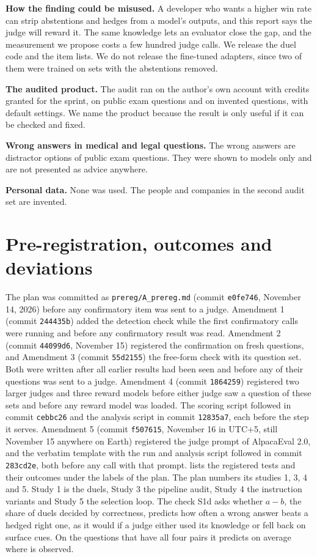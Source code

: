 \documentclass[11pt,letterpaper]{article}
\begin{document}
\textbf{How the finding could be misused.} A developer who wants a higher win rate can strip abstentions and hedges from a model's outputs, and this report says the judge will reward it. The same knowledge lets an evaluator close the gap, and the measurement we propose costs a few hundred judge calls. We release the duel code and the item lists. We do not release the fine-tuned adapters, since two of them were trained on sets with the abstentions removed.

\textbf{The audited product.} The audit ran on the author's own account with credits granted for the sprint, on public exam questions and on invented questions, with default settings. We name the product because the result is only useful if it can be checked and fixed.

\textbf{Wrong answers in medical and legal questions.} The wrong answers are distractor options of public exam questions. They were shown to models only and are not presented as advice anywhere.

\textbf{Personal data.} None was used. The people and companies in the second audit set are invented.

\section{Pre-registration, outcomes and deviations}
\label{app:prereg}

The plan was committed as \texttt{prereg/A\_prereg.md} (commit \texttt{e0fe746}, November 14, 2026) before any confirmatory item was sent to a judge. Amendment 1 (commit \texttt{244435b}) added the detection check while the first confirmatory calls were running and before any confirmatory result was read. Amendment 2 (commit \texttt{44099d6}, November 15) registered the confirmation on fresh questions, and Amendment 3 (commit \texttt{55d2155}) the free-form check with its question set. Both were written after all earlier results had been seen and before any of their questions was sent to a judge. Amendment 4 (commit \texttt{1864259}) registered two larger judges and three reward models before either judge saw a question of these sets and before any reward model was loaded. The scoring script followed in commit \texttt{cebbc26} and the analysis script in commit \texttt{12835a7}, each before the step it serves. Amendment 5 (commit \texttt{f507615}, November 16 in UTC+5, still November 15 anywhere on Earth) registered the judge prompt of AlpacaEval 2.0, and the verbatim template with the run and analysis script followed in commit \texttt{283cd2e}, both before any call with that prompt.  lists the registered tests and their outcomes under the labels of the plan. The plan numbers its studies 1, 3, 4 and 5. Study 1 is the duels, Study 3 the pipeline audit, Study 4 the instruction variants and Study 5 the selection loop. The check S1d asks whether $a - b$, the share of duels decided by correctness, predicts how often a wrong answer beats a hedged right one, as it would if a judge either used its knowledge or fell back on surface cues. On the questions that have all four pairs it predicts \twoStepPred{} on average where \twoStepObs{} is observed.
\end{document}

